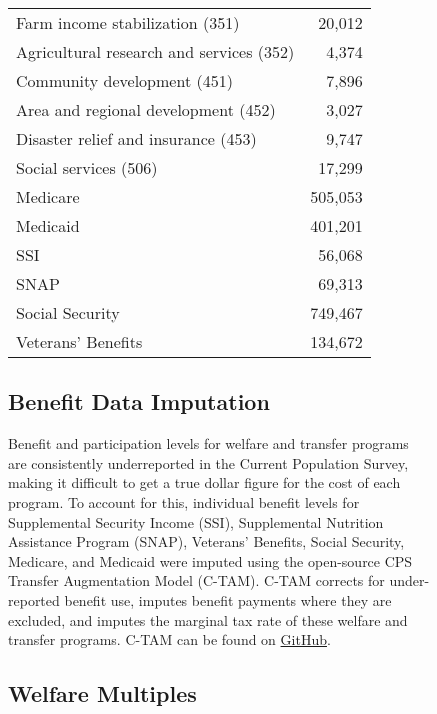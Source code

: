 \documentclass{article}
\begin{document}
\begin{figure}[H]
\begin{table}[H]
\begin{center}
\begin{adjustbox}{max width=\textwidth}
\begin{tabular}{lr}
Farm income stabilization (351) & 20,012 \\
Agricultural research and services (352) & 4,374 \\
Community development (451) & 7,896 \\
Area and regional development (452) & 3,027 \\
Disaster relief and insurance (453) & 9,747 \\
Social services (506) & 17,299 \\
Medicare & 505,053 \\
Medicaid & 401,201 \\
SSI & 56,068 \\
SNAP & 69,313 \\
Social Security & 749,467 \\
Veterans' Benefits & 134,672 \\
\bottomrule
\end{tabular}
\end{adjustbox}
\end{center}
\end{table}
\doublespacing 

\subsection{Benefit Data Imputation}
Benefit and participation levels for welfare and transfer programs are consistently underreported in the Current Population Survey, making it difficult to get a true dollar figure for the cost of each program. To account for this, individual benefit levels for Supplemental Security Income (SSI), Supplemental Nutrition Assistance Program (SNAP), Veterans’ Benefits, Social Security, Medicare, and Medicaid were imputed using the open-source CPS Transfer Augmentation Model (C-TAM). C-TAM corrects for under-reported benefit use, imputes benefit payments where they are excluded, and imputes the marginal tax rate of these welfare and transfer programs. C-TAM can be found on \href{http://www.github.com/open-source-economics/benefits}{GitHub}.


\subsection{Welfare Multiples}


\end{figure}
\end{document}
